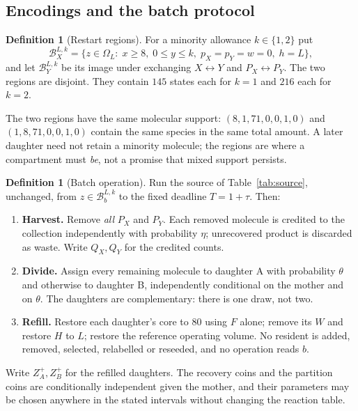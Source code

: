 \documentclass[11pt,a4paper]{article}
\theoremstyle{plain}
\theoremstyle{definition}
\newtheorem{definition}[theorem]{Definition}
\theoremstyle{remark}
\newcommand{\B}{\mathcal B}
\begin{document}
\subsection{Encodings and the batch protocol}

\begin{definition}[Restart regions]\label{def:restart}
For a minority allowance $k\in\{1,2\}$ put
\begin{equation}
\B_X^{L,k}=\{z\in\Omega_L:\;x\ge 8,\;0\le y\le k,\;p_X=p_Y=w=0,\;h=L\},\label{eq:restart}
\end{equation}
and let $\B_Y^{L,k}$ be its image under exchanging $X\leftrightarrow Y$ and
$P_X\leftrightarrow P_Y$. The two regions are disjoint. They contain $145$ states each
for $k=1$ and $216$ each for $k=2$.
\end{definition}

The two regions have the same molecular support: $(8,1,71,0,0,1,0)$ and
$(1,8,71,0,0,1,0)$ contain the same species in the same total amount. A later daughter
need not retain a minority molecule; the regions are where a compartment must \emph{be},
not a promise that mixed support persists.

\begin{definition}[Batch operation]\label{def:protocol}
Run the source of Table~\ref{tab:source}, unchanged, from $z\in\B_b^{L,k}$ to the fixed
deadline $T=1+\tau$. Then:
\begin{enumerate}[label=(O\arabic*),leftmargin=2.6em]
\item \textbf{Harvest.} Remove \emph{all} $P_X$ and $P_Y$. Each removed molecule is
  credited to the collection independently with probability $\eta$; unrecovered product
  is discarded as waste. Write $Q_X,Q_Y$ for the credited counts.
\item \textbf{Divide.} Assign every remaining molecule to daughter A with probability
  $\theta$ and otherwise to daughter B, independently conditional on the mother and on
  $\theta$. The daughters are complementary: there is one draw, not two.
\item \textbf{Refill.} Restore each daughter's core to $80$ using $F$ alone; remove its
  $W$ and restore $H$ to $L$; restore the reference operating volume. No resident is
  added, removed, selected, relabelled or reseeded, and no operation reads $b$.
\end{enumerate}
Write $Z_A^+,Z_B^+$ for the refilled daughters. The recovery coins and the partition
coins are conditionally independent given the mother, and their parameters may be chosen
anywhere in the stated intervals without changing the reaction table.
\end{definition}
\end{document}
